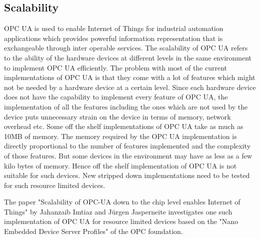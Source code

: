 \documentclass[conference]{IEEEtran}
\begin{document}
\subsection{Scalability}
OPC UA is used to enable Internet of Things for industrial automation applications which provides powerful information representation that is exchangeable through inter operable services. The scalability of OPC UA refers to the ability of the hardware devices at different levels in the same environment to implement OPC UA efficiently. The problem with most of the current implementations of OPC UA is that they come with a lot of features which might not be needed by a hardware device at a certain level. Since each hardware device does not have the capability to implement every feature of OPC UA, the implementation  of all the features including the ones which are not used by the device puts unnecessary strain on the device in terms of memory, network overhead etc. 
Some off the shelf implementations of OPC UA take as much as 10MB of memory. \cite{6622935} The memory required by the OPC UA implementation is directly proportional to the number of features implemented and the complexity of those features. But some devices in the environment may have as less as a few kilo bytes of memory. Hence off the shelf implementation of OPC UA is not suitable for such devices. New stripped down implementations need to be tested for such resource limited devices. 

The paper "Scalability of OPC-UA down to the chip level enables Internet of Things" by Jahanzaib Imtiaz and Jürgen Jasperneite investigates one such implementation of OPC UA for resource limited devices based on the "Nano Embedded Device Server Profiles" of the OPC foundation.   

%
%
\end{document}
